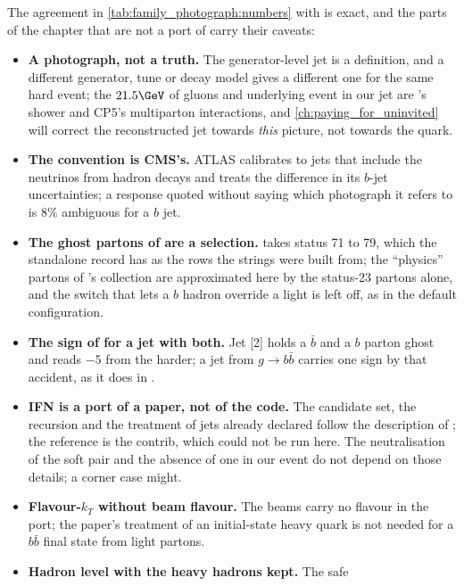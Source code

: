 The agreement in \cref{tab:family_photograph:numbers} with \FASTJET is
exact, and the parts of the chapter that are not a port of \FASTJET
carry their caveats:
\begin{itemize}
  \item \textbf{A photograph, not a truth.} The generator-level jet is
    a definition, and a different generator, tune or decay model gives a
    different one for the same hard event; the $21.5\GeV$ of gluons and
    underlying event in our jet are \PYTHIA's shower and CP5's
    multiparton interactions, and \cref{ch:paying_for_uninvited} will
    correct the reconstructed jet towards \emph{this} picture, not
    towards the quark.
  \item \textbf{The \akfournonu convention is CMS's.} ATLAS calibrates
    to jets that include the neutrinos from hadron decays and treats the
    difference in its $b$-jet uncertainties; a response quoted without
    saying which photograph it refers to is $8\%$ ambiguous for a $b$
    jet.
  \item \textbf{The ghost partons of \CMSSW are a selection.}
     takes status 71 to 79, which the
    standalone record has as the rows the strings were built from; the
    ``physics'' partons of \CMSSW's  collection are
    approximated here by the status-23 partons alone, and the
     switch that lets a $b$ hadron
    override a light \partflav is left off, as in the default
    configuration.
  \item \textbf{The sign of \partflav for a jet with both.} Jet [2] holds
    a $\bar b$ and a $b$ parton ghost and reads $-5$ from the harder; a
    jet from $g\to b\bar b$ carries one sign by that accident, as it does
    in \CMSSW.
  \item \textbf{IFN is a port of a paper, not of the code.} The
    candidate set, the recursion and the treatment of jets already
    declared follow the description of \cite{Caletti:2022glq}; the
    reference is the \FASTJET contrib, which could not be run here. The
    neutralisation of the soft pair and the absence of one in our event
    do not depend on those details; a corner case might.
  \item \textbf{Flavour-$k_T$ without beam flavour.} The beams carry no
    flavour in the port; the paper's treatment of an initial-state
    heavy quark is not needed for a $b\bar b$ final state from light
    partons.
  \item \textbf{Hadron level with the heavy hadrons kept.} The safe

\end{itemize}

